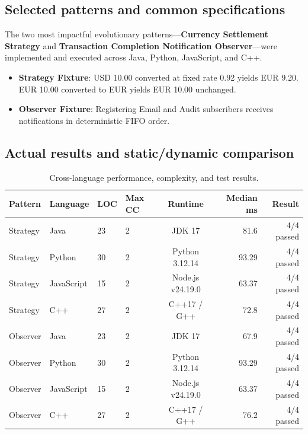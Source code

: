 \documentclass[11pt,a4paper]{article}
\begin{document}
\subsection{Selected patterns and common specifications}
The two most impactful evolutionary patterns---\textbf{Currency Settlement Strategy} and \textbf{Transaction Completion Notification Observer}---were implemented and executed across Java, Python, JavaScript, and C++.
\begin{itemize}[noitemsep]
    \item \textbf{Strategy Fixture}: USD 10.00 converted at fixed rate 0.92 yields EUR 9.20. EUR 10.00 converted to EUR yields EUR 10.00 unchanged.
    \item \textbf{Observer Fixture}: Registering Email and Audit subscribers receives notifications in deterministic FIFO order.
\end{itemize}

\subsection{Actual results and static/dynamic comparison}
\begin{table}[h!]
\centering
\small
\begin{tabularx}{\textwidth}{llllcrr}
\toprule
\textbf{Pattern} & \textbf{Language} & \textbf{LOC} & \textbf{Max CC} & \textbf{Runtime} & \textbf{Median ms} & \textbf{Result} \\
\midrule
Strategy & Java & 23 & 2 & JDK 17 & 81.6 & 4/4 passed \\
Strategy & Python & 30 & 2 & Python 3.12.14 & 93.29 & 4/4 passed \\
Strategy & JavaScript & 15 & 2 & Node.js v24.19.0 & 63.37 & 4/4 passed \\
Strategy & C++ & 27 & 2 & C++17 / G++ & 72.8 & 4/4 passed \\
Observer & Java & 23 & 2 & JDK 17 & 67.9 & 4/4 passed \\
Observer & Python & 30 & 2 & Python 3.12.14 & 93.29 & 4/4 passed \\
Observer & JavaScript & 15 & 2 & Node.js v24.19.0 & 63.37 & 4/4 passed \\
Observer & C++ & 27 & 2 & C++17 / G++ & 76.2 & 4/4 passed \\
\bottomrule
\end{tabularx}
\caption{Cross-language performance, complexity, and test results.}
\end{table}
\end{document}
